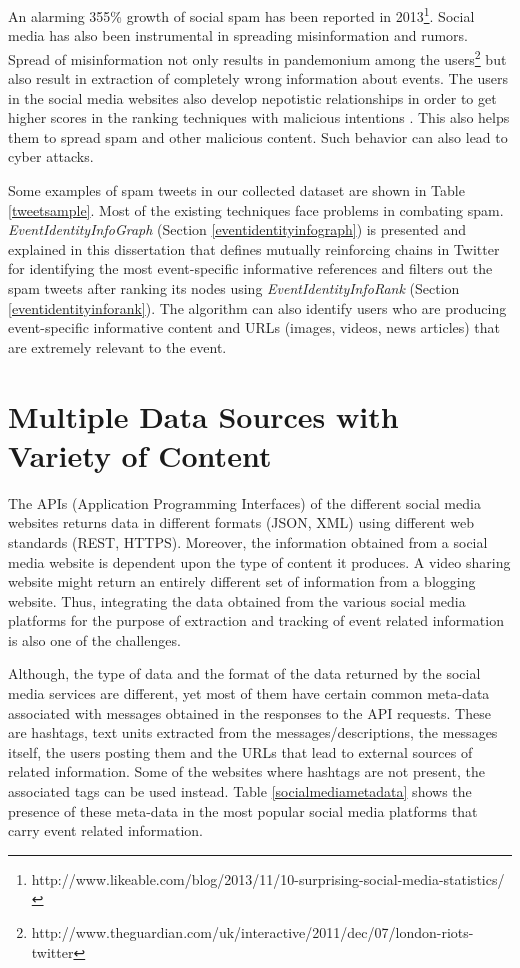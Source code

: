 An alarming 355\% growth of social spam has been reported in 2013\footnote{http://www.likeable.com/blog/2013/11/10-surprising-social-media-statistics/}. Social media has also been instrumental in spreading misinformation and rumors. Spread of misinformation not only results in pandemonium among the users\footnote{http://www.theguardian.com/uk/interactive/2011/dec/07/london-riots-twitter}  but also result in extraction of completely wrong information about events. The users in the social media websites also develop nepotistic relationships in order to get higher scores in the ranking techniques with malicious intentions \cite{gayo2013nepotistic}. This also helps them to spread spam and other malicious content. Such behavior can also lead to cyber attacks.

Some examples of spam tweets in our collected dataset are shown in Table \ref{tweetsample}. Most of the existing techniques face problems in combating spam.  \textit{EventIdentityInfoGraph} (Section \ref{eventidentityinfograph}) is presented and explained in this dissertation that defines mutually reinforcing chains in Twitter for identifying the most event-specific informative references and filters out the spam tweets after ranking its nodes using \textit{EventIdentityInfoRank} (Section \ref{eventidentityinforank}). The algorithm can also identify users who are producing event-specific informative content and URLs (images, videos, news articles) that are extremely relevant to the event. 

\section{Multiple Data Sources with Variety of Content}
The APIs (Application Programming Interfaces) of the different social media websites returns data in different formats (JSON, XML) using different web standards (REST, HTTPS). Moreover, the information obtained from a social media website is dependent upon the type of content it produces. A video sharing website might return an entirely different set of information from a blogging website. Thus, integrating the data obtained from the various social media platforms for the purpose of extraction and tracking of event related information is also one of the challenges.

Although, the type of data and the format of the data returned by the social media services are different, yet most of them have certain common meta-data associated with messages obtained in the responses to the API requests. These are hashtags, text units extracted from the messages/descriptions, the messages itself, the users posting them and the URLs that lead to external sources of related information. Some of the websites where hashtags are not present, the associated tags can be used instead. Table \ref{socialmediametadata} shows the presence of these meta-data in the most popular social media platforms that carry event related information.

